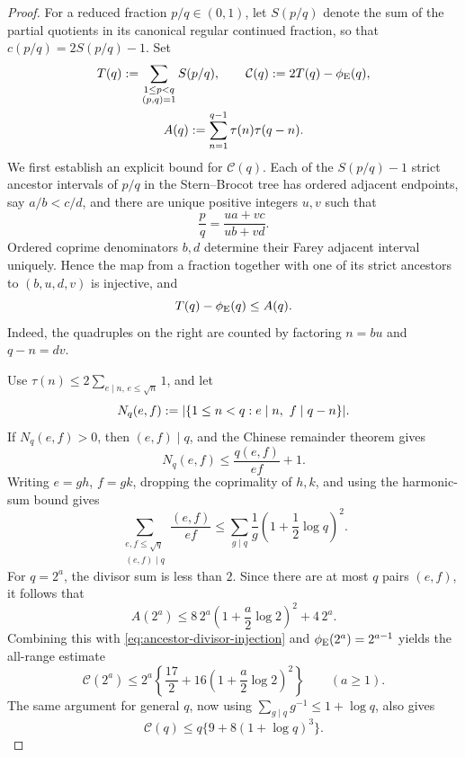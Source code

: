 \begin{proof}
For a reduced fraction \(p/q\in(0,1)\), let \(S(p/q)\) denote the sum of the
partial quotients in its canonical regular continued fraction, so that
\(c(p/q)=2S(p/q)-1\).  Set
\[
 \begin{gathered}
  T(q):=\sum_{\substack{1\le p<q\\(p,q)=1}}S(p/q),
  \qquad
  \mathcal C(q):=2T(q)-\phi_{\rm E}(q),\\
  A(q):=\sum_{n=1}^{q-1}\tau(n)\tau(q-n).
 \end{gathered}
\]
We first establish an explicit bound for \(\mathcal C(q)\).  Each of the
\(S(p/q)-1\) strict ancestor intervals of \(p/q\) in the Stern--Brocot tree
has ordered adjacent endpoints, say \(a/b<c/d\), and there are unique
positive integers \(u,v\) such that
\[
 \frac pq=\frac{ua+vc}{ub+vd}.
\]
Ordered coprime denominators \(b,d\) determine their Farey adjacent interval
uniquely.  Hence the map from a fraction together with one of its strict
ancestors to \((b,u,d,v)\) is injective, and
\begin{equation}
 T(q)-\phi_{\rm E}(q)\le A(q).
 \label{eq:ancestor-divisor-injection}
\end{equation}
Indeed, the quadruples on the right are counted by factoring
\(n=bu\) and \(q-n=dv\).

Use
\(\tau(n)\le2\sum_{e\mid n,\,e\le\sqrt n}1\), and let
\[
 N_q(e,f):=\lvert \{1\le n<q:e\mid n,\ f\mid q-n\} \rvert.
\]
If \(N_q(e,f)>0\), then \((e,f)\mid q\), and the Chinese remainder theorem
gives
\[
 N_q(e,f)\le\frac{q(e,f)}{ef}+1.
\]
Writing \(e=gh\), \(f=gk\), dropping the coprimality of \(h,k\), and using
the harmonic-sum bound gives
\[
 \sum_{\substack{e,f\le\sqrt q\\(e,f)\mid q}}
 \frac{(e,f)}{ef}
 \le\sum_{g\mid q}\frac1g
       \left(1+\frac12\log q\right)^2.
\]
For \(q=2^a\), the divisor sum is less than \(2\).  Since there are at most
\(q\) pairs \((e,f)\), it follows that
\[
 A(2^a)\le8\,2^a\left(1+\frac a2\log2\right)^2+4\,2^a.
\]
Combining this with \eqref{eq:ancestor-divisor-injection} and
\(\phi_{\rm E}(2^a)=2^{a-1}\) yields the all-range estimate
\begin{equation}
 \mathcal C(2^a)
 \le2^a\left\{\frac{17}{2}
       +16\left(1+\frac a2\log2\right)^2\right\}
 \qquad(a\ge1).
 \label{eq:dyadic-cost-sum-bound}
\end{equation}
The same argument for general \(q\), now using
\(\sum_{g\mid q}g^{-1}\le1+\log q\), also gives
\begin{equation}
 \mathcal C(q)\le q\{9+8(1+\log q)^3\}.
 \label{eq:general-cost-sum-bound}
\end{equation}


\end{proof}

